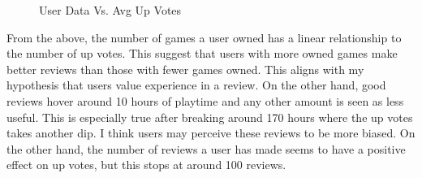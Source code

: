 \begin{figure}[H]
    \centering
    \caption{User Data Vs. Avg Up Votes}
\end{figure}

From the above, the number of games a user owned has a linear relationship to the number of up votes. This suggest that users with more owned games make better reviews than those with fewer games owned. This aligns with my hypothesis that users value experience in a review. On the other hand, good reviews hover around 10 hours of playtime and any other amount is seen as less useful. This is especially true after breaking around 170 hours where the up votes takes another dip. I think users may perceive these reviews to be more biased. On the other hand, the number of reviews a user has made seems to have a positive effect on up votes, but this stops at around 100 reviews.  
